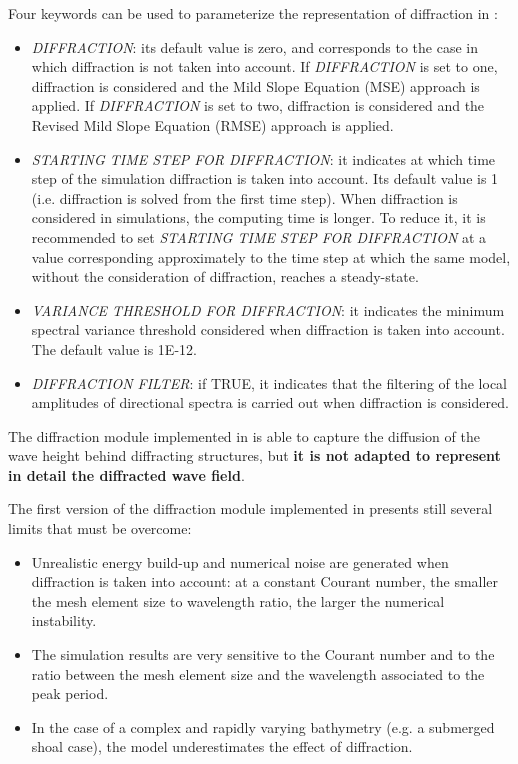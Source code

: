 Four keywords can be used to parameterize the representation of diffraction in \tomawac:

\begin{itemize}
\item  \textit{DIFFRACTION}: its default value is zero, and corresponds to the case in which diffraction is not taken into account. If \textit{DIFFRACTION} is set to one, diffraction is considered and the Mild Slope Equation (MSE) approach is applied. If \textit{DIFFRACTION} is set to two, diffraction is considered and the Revised Mild Slope Equation (RMSE) approach is applied.

\item  \textit{STARTING TIME STEP FOR DIFFRACTION}: it indicates at which time step of the simulation diffraction is taken into account. Its default value is 1 (i.e. diffraction is solved from the first time step). When diffraction is considered in \tomawac simulations, the computing time is longer. To reduce it, it is recommended to set \textit{STARTING TIME STEP FOR DIFFRACTION} at a value corresponding approximately to the time step at which the same \tomawac model, without the consideration of diffraction, reaches a steady-state.

\item  \textit{VARIANCE THRESHOLD FOR DIFFRACTION}: it indicates the minimum spectral variance threshold considered when diffraction is taken into account. The default value is 1E-12.

\item  \textit{DIFFRACTION FILTER}: if TRUE, it indicates that the filtering of the local amplitudes of directional spectra is carried out when diffraction is considered.
\end{itemize}

 The diffraction module implemented in \tomawac is able to capture the diffusion of the wave height behind diffracting structures, but \textbf{it is not adapted to represent in detail the diffracted wave field}.

 The first version of the diffraction module implemented in \tomawac presents still several limits that must be overcome:

\begin{itemize}
\item  Unrealistic energy build-up and numerical noise are generated when diffraction is taken into account: at a constant Courant number, the smaller the mesh element size to wavelength ratio, the larger the numerical instability.

\item  The simulation results are very sensitive to the Courant number and to the ratio between the mesh element size and the wavelength associated to the peak period.

\item  In the case of a complex and rapidly varying bathymetry (e.g. a submerged shoal case), the model underestimates the effect of diffraction.
\end{itemize}

